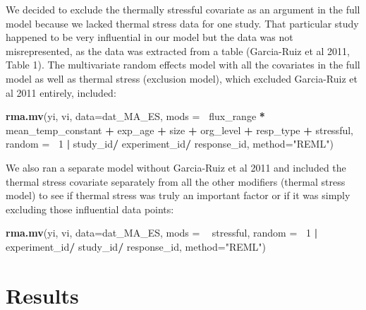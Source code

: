 \documentclass[12pt,twoside]{reedthesis}
\newenvironment{Shaded}{\begin{snugshade}}{\end{snugshade}}
\newcommand{\DataTypeTok}[1]{\textcolor[rgb]{0.13,0.29,0.53}{#1}}
\newcommand{\DecValTok}[1]{\textcolor[rgb]{0.00,0.00,0.81}{#1}}
\newcommand{\KeywordTok}[1]{\textcolor[rgb]{0.13,0.29,0.53}{\textbf{#1}}}
\newcommand{\NormalTok}[1]{#1}
\newcommand{\OperatorTok}[1]{\textcolor[rgb]{0.81,0.36,0.00}{\textbf{#1}}}
\newcommand{\StringTok}[1]{\textcolor[rgb]{0.31,0.60,0.02}{#1}}
\begin{document}
We decided to exclude the thermally stressful covariate as an argument in the full model because we lacked thermal stress data for one study. That particular study happened to be very influential in our model but the data was not misrepresented, as the data was extracted from a table (Garcia-Ruiz et al 2011, Table 1). The multivariate random effects model with all the covariates in the full model as well as thermal stress (exclusion model), which excluded Garcia-Ruiz et al 2011 entirely, included:
\begin{Shaded}
\begin{Highlighting}[]
\KeywordTok{rma.mv}\NormalTok{(yi, vi, }\DataTypeTok{data=}\NormalTok{dat_MA_ES, }\DataTypeTok{mods =} \OperatorTok{~}\NormalTok{flux_range }\OperatorTok{*}\StringTok{ }\NormalTok{mean_temp_constant }
       \OperatorTok{+}\StringTok{ }\NormalTok{exp_age }\OperatorTok{+}\StringTok{ }\NormalTok{size }\OperatorTok{+}\StringTok{ }\NormalTok{org_level }\OperatorTok{+}\StringTok{ }\NormalTok{resp_type }\OperatorTok{+}\StringTok{ }\NormalTok{stressful, }
               \DataTypeTok{random =} \OperatorTok{~}\DecValTok{1} \OperatorTok{|}\StringTok{  }\NormalTok{study_id}\OperatorTok{/}\StringTok{ }\NormalTok{experiment_id}\OperatorTok{/}\StringTok{ }\NormalTok{response_id,}
                 \DataTypeTok{method=}\StringTok{"REML"}\NormalTok{) }
\end{Highlighting}
\end{Shaded}
We also ran a separate model without Garcia-Ruiz et al 2011 and included the thermal stress covariate separately from all the other modifiers (thermal stress model) to see if thermal stress was truly an important factor or if it was simply excluding those influential data points:
\begin{Shaded}
\begin{Highlighting}[]
\KeywordTok{rma.mv}\NormalTok{(yi, vi, }\DataTypeTok{data=}\NormalTok{dat_MA_ES, }\DataTypeTok{mods =}  \OperatorTok{~}\StringTok{ }\NormalTok{stressful, }
               \DataTypeTok{random =} \OperatorTok{~}\DecValTok{1} \OperatorTok{|}\StringTok{ }\NormalTok{experiment_id}\OperatorTok{/}\StringTok{ }\NormalTok{study_id}\OperatorTok{/}\StringTok{ }\NormalTok{response_id,}
                 \DataTypeTok{method=}\StringTok{"REML"}\NormalTok{) }
\end{Highlighting}
\end{Shaded}
\hypertarget{results}{%
\chapter{Results}\label{results}}
\end{document}
